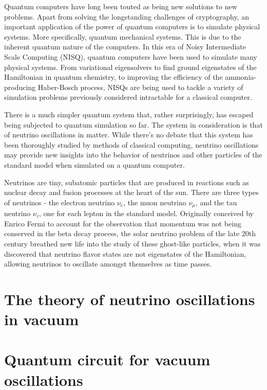 \documentclass[aps,twocolumn,showpacs,preprintnumbers]{revtex4}
\begin{document}

Quantum computers have long been touted as being new solutions to new problems. Apart from solving the longstanding challenges of cryptography, an important application of the power of quantum computers is to simulate physical systems. More specifically, quantum mechanical systems. This is due to the inherent quantum nature of the computers. In this era of Noisy Intermediate Scale Computing (NISQ), quantum computers have been used to simulate many physical systems. From variational eigensolvers to find ground eigenstates of the Hamiltonian in quantum chemistry, to improving the efficiency of the ammonia-producing Haber-Bosch process, NISQs are being used to tackle a variety of simulation problems previously considered intractable for a classical computer.

There is a much simpler quantum system that, rather surprisingly, has escaped being subjected to quantum simulation so far. The system in consideration is that of neutrino oscillations in matter. While there's no debate that this system has been thoroughly studied by methods of classical computing, neutrino oscillations may provide new insights into the behavior of neutrinos and other particles of the standard model when simulated on a quantum computer.

Neutrinos are tiny, subatomic particles that are produced in reactions such as nuclear decay and fusion processes at the heart of the sun. There are three types of neutrinos - the electron neutrino $\nu_e$, the muon neutrino $\nu_\mu$, and the tau neutrino $\nu_\tau$, one for each lepton in the standard model. Originally conceived by Enrico Fermi to account for the observation that momentum was not being conserved in the beta decay process, the solar neutrino problem of the late 20th century breathed new life into the study of these ghost-like particles, when it was discovered that neutrino flavor states are not eigenstates of the Hamiltonian, allowing neutrinos to oscillate amongst themselves as time passes.

\section{The theory of neutrino oscillations in vacuum}

\section{Quantum circuit for vacuum oscillations}
\end{document}

